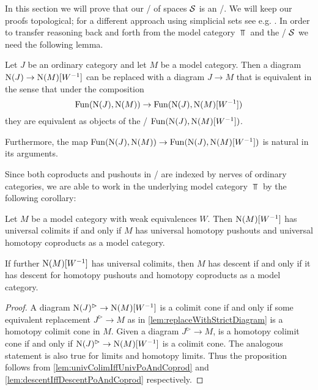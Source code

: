 In this section we will prove that our \inftycat/ of spaces $\mathcal{S}$ is an \inftytop/.
We will keep our proofs topological; for a different approach using simplicial sets see e.g. \cite[\S 6]{HTT}.
In order to transfer reasoning back and forth from the model category $\Top$ and the \inftycat/ $\mathcal{S}$ we need the following lemma.
\begin{lemma}\label{lem:replaceWithStrictDiagram} %
    Let $J$ be an ordinary category and let $M$ be a model category.
    Then a diagram $\operatorname{N}(J)\to\operatorname{N}(M)[W^{-1}]$ can be replaced with a diagram $J\to M$ that is equivalent in the sense that under the composition
    \begin{equation*}
        \Fun(\N(J),\N(M))\to\Fun(\N(J),\N(M)[W^{-1}]) %
    \end{equation*} 
    they are equivalent as objects of the \inftycat/ $\operatorname{Fun}(\operatorname{N}(J),\operatorname{N}(M)[W^{-1}])$.

    Furthermore, the map $\operatorname{Fun}(\operatorname{N}(J),\operatorname{N}(M))\to\operatorname{Fun}(\operatorname{N}(J),\operatorname{N}(M)[W^{-1}])$ is natural in its arguments.
    \begin{reference}
        \cite[Proposition 1.3.4.25]{higher_algebra}
    \end{reference}
\end{lemma}
Since both coproducts and pushouts in \inftycats/ are indexed by nerves of ordinary categories, we are able to work in the underlying model category $\Top$ by the following corollary:
\begin{corollary}\label{cor:sufficientToProveInModCat}
    Let $M$ be a model category with weak equivalences $W$. 
    Then $\operatorname{N}(M)[W^{-1}]$ has universal colimits if and only if $M$ has universal homotopy pushouts and universal homotopy coproducts as a model category.
    
    If further $\operatorname{N}(M)[W^{-1}]$ has universal colimits, then $M$ has descent if and only if it has descent for homotopy pushouts and homotopy coproducts as a model category.
    \begin{proof}
        A diagram $\operatorname{N}(J)^{\rhd}\to\operatorname{N}(M)[W^{-1}]$ is a colimit cone if and only if some equivalent replacement $J^{\rhd}\to M$ as in \cref{lem:replaceWithStrictDiagram} is a homotopy colimit cone in $M$.
        Given a diagram $J^{\rhd}\to M$, is a homotopy colimit cone if and only if $\operatorname{N}(J)^{\rhd}\to\operatorname{N}(M)[W^{-1}]$ is a colimit cone.
        The analogous statement is also true for limits and homotopy limits.
        Thus the proposition follows from \cref{lem:univColimIffUnivPoAndCoprod} and \cref{lem:descentIffDescentPoAndCoprod} respectively.
    \end{proof}
\end{corollary}
